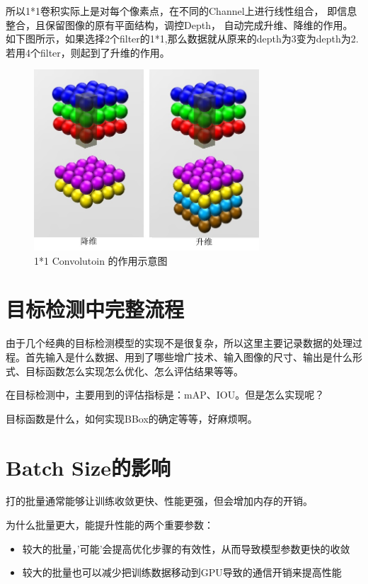 所以1*1卷积实际上是对每个像素点，在不同的Channel上进行线性组合， 即信息整合，且保留图像的原有平面结构，调控Depth， 自动完成升维、降维的作用。如下图所示，如果选择2个filter的1*1,那么数据就从原来的depth为3变为depth为2.若用4个filter，则起到了升维的作用。
\begin{figure}[!hbtp]
\centering
\includegraphics[width=0.75\textwidth]{DLTips/OneOneConv0.jpg}
\caption{1*1 Convolutoin 的作用示意图}
\label{OneOneConv0}
\end{figure}

\section{目标检测中完整流程}

由于几个经典的目标检测模型的实现不是很复杂，所以这里主要记录数据的处理过程。首先输入是什么数据、用到了哪些增广技术、输入图像的尺寸、输出是什么形式、目标函数怎么实现怎么优化、怎么评估结果等等。

在目标检测中，主要用到的评估指标是：mAP、IOU。但是怎么实现呢？

目标函数是什么，如何实现BBox的确定等等，好麻烦啊。

\section{Batch Size的影响}

打的批量通常能够让训练收敛更快、性能更强，但会增加内存的开销。

为什么批量更大，能提升性能的两个重要参数：
\begin{itemize}
\item 较大的批量，'可能'会提高优化步骤的有效性，从而导致模型参数更快的收敛
\item 较大的批量也可以减少把训练数据移动到GPU导致的通信开销来提高性能
\end{itemize}

